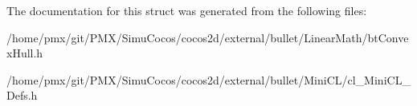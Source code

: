 The documentation for this struct was generated from the following files\+:\begin{DoxyCompactItemize}
\item 
/home/pmx/git/\+P\+M\+X/\+Simu\+Cocos/cocos2d/external/bullet/\+Linear\+Math/bt\+Convex\+Hull.\+h\item 
/home/pmx/git/\+P\+M\+X/\+Simu\+Cocos/cocos2d/external/bullet/\+Mini\+C\+L/cl\+\_\+\+Mini\+C\+L\+\_\+\+Defs.\+h\end{DoxyCompactItemize}
